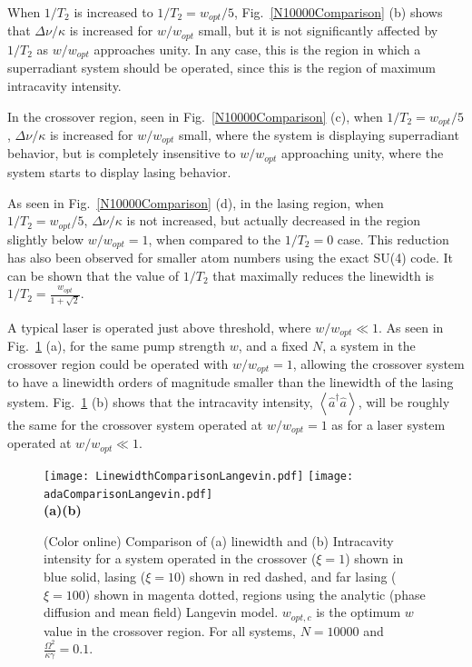 \documentclass[aps,
twocolumn,
superscriptaddress,groupedaddress]{revtex4}
\begin{document}
When $1/T_2$ is increased to $1/T_2=w_{opt}/5$,
Fig.~\ref{N10000Comparison} (b) shows that $\Delta \nu/\kappa$ is
increased for $w/w_{opt}$ small, but it is not significantly affected by
$1/T_2$ as $w/w_{opt}$ approaches unity. In any case, this is the region
in which a superradiant system should be operated, since this is the
region of maximum intracavity intensity.

In the crossover region, seen in Fig.~\ref{N10000Comparison} (c), when
$1/T_2=w_{opt}/5$, $\Delta \nu/\kappa$ is increased for $w/w_{opt}$
small, where the system is displaying superradiant behavior, but is
completely insensitive to $w/w_{opt}$ approaching unity, where the
system starts to display lasing behavior.

As seen in Fig.~\ref{N10000Comparison} (d), in the lasing region, when
$1/T_2=w_{opt}/5$, $\Delta \nu/\kappa$ is not increased, but actually
decreased in the region slightly below $w/w_{opt}=1$, when compared to
the $1/T_2=0$ case. This reduction has also been observed for smaller
atom numbers using the exact SU(4) code. It can be shown that the value
of $1/T_2$ that maximally reduces the linewidth is
$1/T_2=\frac{w_{opt}}{1+\sqrt{2}}$.

A typical laser is operated just above threshold, where $w/w_{opt} \ll
1$. As seen in Fig.~\ref{LWadaComparison} (a), for the same pump
strength $w$, and a fixed $N$, a system in the crossover region could be
operated with $w/w_{opt} = 1$, allowing the crossover system to have a
linewidth orders of magnitude smaller than the linewidth of the lasing
system. Fig.~\ref{LWadaComparison} (b) shows that the intracavity
intensity, $\left<\hat{a}^{\dagger}\hat{a}\right>$, will be roughly the
same for the crossover system operated at $w/w_{opt} = 1$ as for a laser
system operated at  $w/w_{opt} \ll 1$.

\begin{figure}
\begin{center}
	\texttt{[image: LinewidthComparisonLangevin.pdf]}
	\hspace{-4mm} \texttt{[image: adaComparisonLangevin.pdf]}\\
	\hspace{6mm}\textbf{(a)}\hspace{37mm}\textbf{(b)} \hspace{35mm}
\end{center}
		\vspace{-5mm}
\caption{(Color online) Comparison of (a) linewidth and (b) Intracavity
intensity for a system operated in the crossover ($\xi=1$) shown in blue
solid, lasing ($\xi=10$) shown in red dashed, and far lasing ($\xi=100$)
shown in magenta dotted, regions using the analytic (phase diffusion and mean field) Langevin model. $w_{opt,c}$ is the optimum $w$ value
in the crossover region. For all systems, $N=10000$ and $\frac{\Omega^2}{\kappa \gamma}=0.1$.}
\label{LWadaComparison}
\end{figure}
\end{document}

